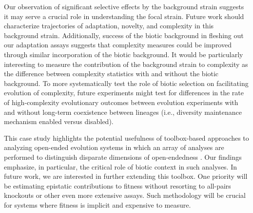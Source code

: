 Our observation of significant selective effects by the background strain suggests it may serve a crucial role in understanding the focal strain.
Future work should characterize trajectories of adaptation, novelty, and complexity in this background strain.
Additionally, success of the biotic background in fleshing out our adaptation assays suggests that complexity measures could be improved through similar incorporation of the biotic background.
It would be particularly interesting to measure the contribution of the background strain to complexity as the difference between complexity statistics with and without the biotic background.
To more systematically test the role of biotic selection on facilitating evolution of complexity, future experiments might test for differences in the rate of high-complexity evolutionary outcomes between evolution experiments with and without long-term coexistence between lineages (i.e., diversity maintenance mechanism enabled versus disabled).

This case study highlights the potential usefulness of toolbox-based approaches to analyzing open-ended evolution systems in which an array of analyses are performed to distinguish disparate dimensions of open-endedness \citep{dolson2019modes}.
Our findings emphasize, in particular, the critical role of biotic context in such analyses.
In future work, we are interested in further extending this toolbox.
One priority will be estimating epistatic contributions to fitness without resorting to all-pairs knockouts or other even more extensive assays.
Such methodology will be crucial for systems where fitness is implicit and expensive to measure.









